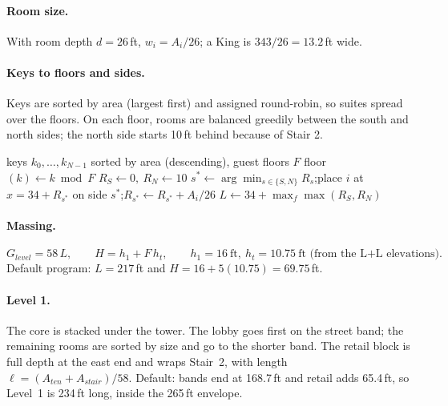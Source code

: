 \documentclass[10pt,a4paper]{article}
\theoremstyle{definition}
\begin{document}
\paragraph{Room size.} With room depth $d=26$\,ft, $w_i=A_i/26$; a King is $343/26=13.2$\,ft wide.

\paragraph{Keys to floors and sides.} Keys are sorted by area (largest first) and assigned round-robin, so suites
spread over the floors. On each floor, rooms are balanced greedily between the south and north sides; the north side
starts 10\,ft behind because of Stair 2.

\begin{algorithm}[H]
\caption{Guest-floor layout}
\label{alg:wing}
\begin{algorithmic}[1]
\Require keys $k_0,\dots,k_{N-1}$ sorted by area (descending), guest floors $F$
 \State floor$(k) \gets k \bmod F$ \EndFor
{}
  \State $R_S \gets 0,\ R_N \gets 10$ 
    \State $s^\ast \gets \arg\min_{s\in\{S,N\}} R_s$;\quad place $i$ at $x=34+R_{s^\ast}$ on side $s^\ast$;\quad $R_{s^\ast}\gets R_{s^\ast}+A_i/26$
  \EndFor
\EndFor
\State $L \gets 34+\max_f \max(R_S, R_N)$ 
\end{algorithmic}
\end{algorithm}

\paragraph{Massing.}
\begin{equation}
G_{level}=58\,L,\qquad H=h_1+F\,h_t,\qquad h_1=16\ \text{ft},\ h_t=10.75\ \text{ft (from the L+L elevations).}
\end{equation}
Default program: $L=217$\,ft and $H=16+5(10.75)=69.75$\,ft.

\paragraph{Level 1.} The core is stacked under the tower. The lobby goes first on the street band; the remaining rooms
are sorted by size and go to the shorter band. The retail block is full depth at the east end and wraps Stair~2, with
length $\ell=(A_{ten}+A_{stair})/58$. Default: bands end at 168.7\,ft and retail adds 65.4\,ft, so Level~1 is
234\,ft long, inside the 265\,ft envelope.
\end{document}
